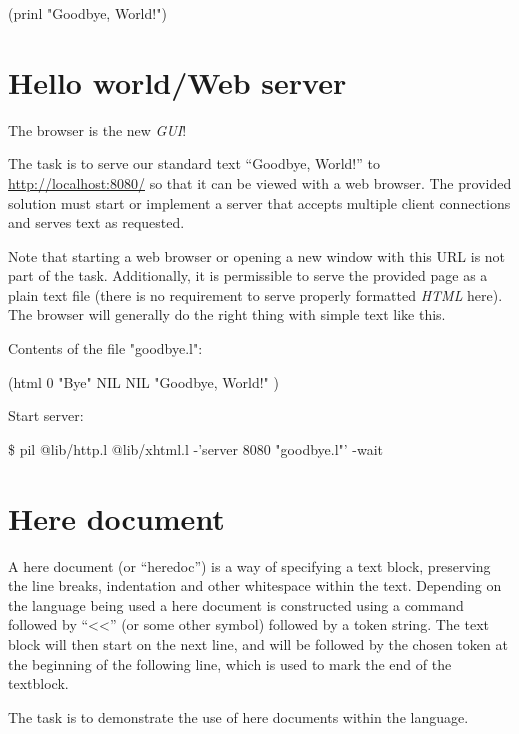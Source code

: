 \begin{itemize}
\begin{wideverbatim}

(prinl "Goodbye, World!")

\end{wideverbatim}

\pagebreak{}
\section*{Hello world/Web server}

The browser is the new \emph{GUI}!

The task is to serve our standard text ``Goodbye, World!'' to
\href{http://localhost:8080/}{http://localhost:8080/} so that it can
be viewed with a web browser. The provided solution must start or
implement a server that accepts multiple client connections and serves
text as requested.

Note that starting a web browser or opening a new window with this URL
is not part of the task. Additionally, it is permissible to serve the
provided page as a plain text file (there is no requirement to serve
properly formatted \emph{HTML} here). The browser will generally do
the right thing with simple text like this.

\begin{wideverbatim}

Contents of the file "goodbye.l":

(html 0 "Bye" NIL NIL
   "Goodbye, World!" )

Start server:

\$ pil @lib/http.l @lib/xhtml.l -'server 8080 "goodbye.l"' -wait

\end{wideverbatim}

\pagebreak{}
\section*{Here document}

A here document (or ``heredoc'') is a way of specifying a text block,
preserving the line breaks, indentation and other whitespace within the
text. Depending on the language being used a here document is
constructed using a command followed by ``\textless{}\textless{}'' (or
some other symbol) followed by a token string. The text block will then
start on the next line, and will be followed by the chosen token at the
beginning of the following line, which is used to mark the end of the
textblock.

The task is to demonstrate the use of here documents within the
language.


\end{itemize}
